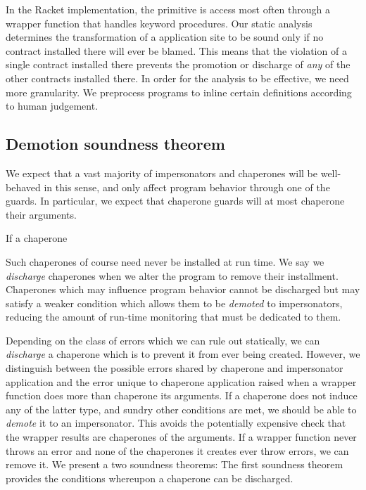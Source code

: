\documentclass{sigplanconf}
\begin{document}
In the Racket implementation, the  primitive is access most often through a wrapper function that handles keyword procedures.
Our static analysis determines the transformation of a  application site to be sound only if no contract installed there will ever be blamed.
This means that the violation of a single contract installed there prevents the promotion or discharge of \emph{any} of the other contracts installed there.
In order for the analysis to be effective, we need more granularity.
We preprocess programs to inline certain definitions according to human judgement.

\subsection{Demotion soundness theorem}





We expect that a vast majority of impersonators and chaperones will be well-behaved in this sense, and only affect program behavior through one of the guards.
In particular, we expect that chaperone guards will at most chaperone their arguments.







If a chaperone 



Such chaperones of course need never be installed at run time.
We say we \emph{discharge} chaperones when we alter the program to remove their installment.
Chaperones which may influence program behavior cannot be discharged but may satisfy a weaker condition which allows them to be \emph{demoted} to impersonators, reducing the amount of run-time monitoring that must be dedicated to them.




Depending on the class of errors which we can rule out statically, we can \emph{discharge} a chaperone which is to prevent it from ever being created.
However, we distinguish between the possible errors shared by chaperone and impersonator application and the error unique to chaperone application raised when a wrapper function does more than chaperone its arguments.
If a chaperone does not induce any of the latter type, and sundry other conditions are met, we should be able to \emph{demote} it to an impersonator.
This avoids the potentially expensive check that the wrapper results are chaperones of the arguments.
If a wrapper function never throws an error and none of the chaperones it creates ever throw errors, we can remove it.
We present a two soundness theorems:
The first soundness theorem provides the conditions whereupon a chaperone can be discharged.
\end{document}
